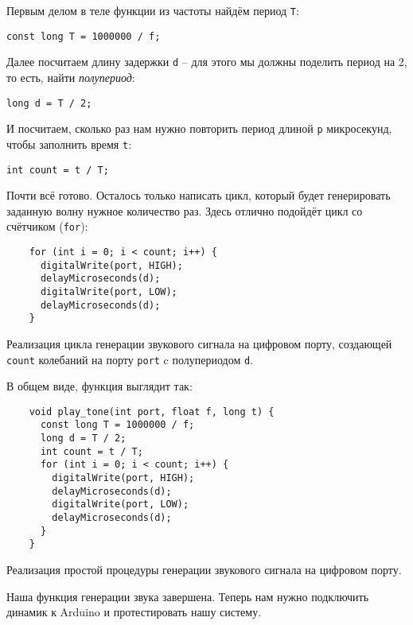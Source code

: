 \documentclass[../sparc.tex]{subfiles}
\begin{document}
Первым делом в теле функции из частоты найдём период \texttt{T}:
\begin{verbatim}
const long T = 1000000 / f;
\end{verbatim}

Далее посчитаем длину задержки \texttt{d} -- для этого мы должны поделить период
на 2, то есть, найти \emph{полупериод}:
\begin{verbatim}
long d = T / 2;
\end{verbatim}

И посчитаем, сколько раз нам нужно повторить период длиной \texttt{p}
микросекунд, чтобы заполнить время \texttt{t}:
\begin{verbatim}
int count = t / T;
\end{verbatim}

Почти всё готово. Осталось только написать цикл, который будет генерировать
заданную волну нужное количество раз. Здесь отлично подойдёт цикл со счётчиком
(\texttt{for}):

\begin{listing}[H]
  \begin{verbatim}
    for (int i = 0; i < count; i++) {
      digitalWrite(port, HIGH);
      delayMicroseconds(d);
      digitalWrite(port, LOW);
      delayMicroseconds(d);
    }
  \end{verbatim}
  \label{listing:play-tone-cycle}
  \caption{Реализация цикла генерации звукового сигнала на цифровом порту,
    создающей \texttt{count} колебаний на порту \texttt{port} c полупериодом
    \texttt{d}.}
\end{listing}

В общем виде, функция выглядит так:

\begin{listing}[H]
  \begin{verbatim}
    void play_tone(int port, float f, long t) {
      const long T = 1000000 / f;
      long d = T / 2;
      int count = t / T;
      for (int i = 0; i < count; i++) {
        digitalWrite(port, HIGH);
        delayMicroseconds(d);
        digitalWrite(port, LOW);
        delayMicroseconds(d);
      }
    }
  \end{verbatim}
  \label{listing:play-tone-procedure}
  \caption{Реализация простой процедуры генерации звукового сигнала на цифровом
    порту.}
\end{listing}

Наша функция генерации звука завершена. Теперь нам нужно подключить динамик к
Arduino и протестировать нашу систему.

\end{document}
